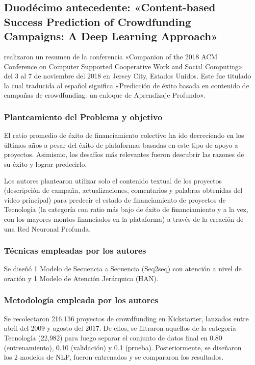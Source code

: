 \subsection{Duodécimo antecedente: «Content-based Success Prediction of Crowdfunding Campaigns: A Deep	Learning Approach» \citep*{pr_lee2018contentDL}}
\citeauthor{pr_lee2018contentDL} realizaron un resumen de la conferencia «Companion of the 2018 ACM Conference on Computer Supported Cooperative Work and Social Computing» del 3 al 7 de noviembre del 2018 en Jersey City, Estados Unidos. Este fue titulado  la cual traducida al español significa «Predicción de éxito basada en contenido de campañas de crowdfunding: un enfoque de Aprendizaje Profundo».

\subsubsection{Planteamiento del Problema y objetivo}
El ratio promedio de éxito de financiamiento colectivo ha ido decreciendo en los últimos años a pesar del éxito de plataformas basadas en este tipo de apoyo a proyectos. Asimismo, los desafíos más relevantes fueron descubrir las razones de su éxito y lograr predecirlo.

Los autores plantearon utilizar solo el contenido textual de los proyectos (descripción de campaña, actualizaciones, comentarios y palabras obtenidas del video principal) para predecir el estado de financiamiento de proyectos de Tecnología (la categoría con ratio más bajo de éxito de financiamiento y a la vez, con los mayores montos financiados en la plataforma) a través de la creación de una Red Neuronal Profunda.

\subsubsection{Técnicas empleadas por los autores}
Se diseñó 1 Modelo de Secuencia a Secuencia (Seq2seq) con atención a nivel de oración y 1 Modelo de Atención Jerárquica (HAN).

\subsubsection{Metodología empleada por los autores}
Se recolectaron 216,136 proyectos de crowdfunding en Kickstarter, lanzados entre abril del 2009 y agosto del 2017. De ellos, se filtraron aquellos de la categoría Tecnología (22,982) para luego separar el conjunto de datos final en 0.80 (entrenamiento), 0.10 (validación) y 0.1 (prueba). Posteriormente, se diseñaron los 2 modelos de NLP, fueron entrenados y se compararon los resultados.

